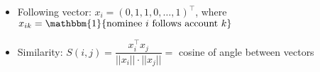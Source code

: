\documentclass{article}
\begin{document}
	\Huge
	\begin{itemize}
		\item Following vector: $x_i = (0, 1, 1, 0, \ldots, 1)^\top$,
		where $x_{ik} = \mathbbm{1} \{\text{nominee $i$ follows account $k$}\}$
		\item Similarity: $S(i, j) = \dfrac{x_i^\top x_j} {||x_i|| \cdot ||x_j||} = $ cosine of angle between vectors
	\end{itemize}
\end{document}
